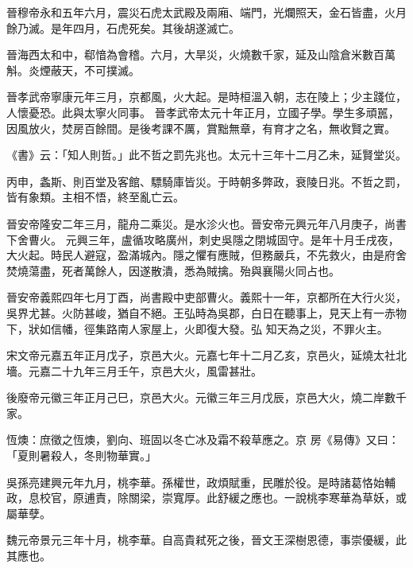 \begin{pinyinscope}
 晉穆帝永和五年六月，震災石虎太武殿及兩廂、端門，光爛照天，金石皆盡，火月餘乃滅。是年四月，石虎死矣。其後胡遂滅亡。



 晉海西太和中，郗愔為會稽。六月，大旱災，火燒數千家，延及山陰倉米數百萬斛。炎煙蔽天，不可撲滅。



 晉孝武帝寧康元年三月，京都風，火大起。是時桓溫入朝，志在陵上；少主踐位，人懷憂恐。此與太寧火同事。
 晉孝武帝太元十年正月，立國子學。學生多頑嚚，因風放火，焚房百餘間。是後考課不厲，賞黜無章，有育才之名，無收賢之實。



 《書》云：「知人則哲。」此不哲之罰先兆也。太元十三年十二月乙未，延賢堂災。



 丙申，螽斯、則百堂及客館、驃騎庫皆災。于時朝多弊政，衰陵日兆。不哲之罰，皆有象類。主相不悟，終至亂亡云。



 晉安帝隆安二年三月，龍舟二乘災。是水沴火也。晉安帝元興元年八月庚子，尚書下舍曹火。
 元興三年，盧循攻略廣州，刺史吳隱之閉城固守。是年十月壬戌夜，大火起。時民人避寇，盈滿城內。隱之懼有應賊，但務嚴兵，不先救火，由是府舍焚燒蕩盡，死者萬餘人，因遂散潰，悉為賊擒。殆與襄陽火同占也。



 晉安帝義熙四年七月丁酉，尚書殿中吏部曹火。義熙十一年，京都所在大行火災，吳界尤甚。火防甚峻，猶自不絕。王弘時為吳郡，白日在聽事上，見天上有一赤物下，狀如信幡，徑集路南人家屋上，火即復大發。弘
 知天為之災，不罪火主。



 宋文帝元嘉五年正月戊子，京邑大火。元嘉七年十二月乙亥，京邑火，延燒太社北墻。元嘉二十九年三月壬午，京邑大火，風雷甚壯。



 後廢帝元徽三年正月己巳，京邑大火。元徽三年三月戊辰，京邑大火，燒二岸數千家。



 恆燠：庶徵之恆燠，劉向、班固以冬亡冰及霜不殺草應之。京
 房《易傳》又曰：「夏則暑殺人，冬則物華實。」



 吳孫亮建興元年九月，桃李華。孫權世，政煩賦重，民雕於役。是時諸葛恪始輔政，息校官，原逋責，除關梁，崇寬厚。此舒緩之應也。一說桃李寒華為草妖，或屬華孽。



 魏元帝景元三年十月，桃李華。自高貴弒死之後，晉文王深樹恩德，事崇優緩，此其應也。




\end{pinyinscope}
